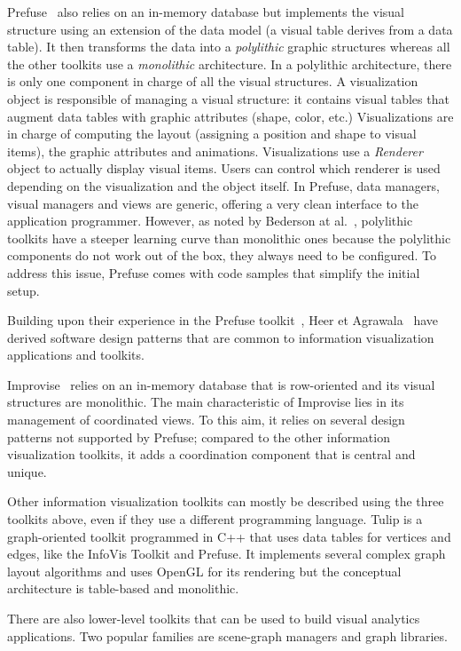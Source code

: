 Prefuse~\cite{Prefuse} also relies on an in-memory database but
implements the visual structure using an extension of the data model
(a visual table derives from a data table).  It then transforms the
data into a \emph{polylithic} graphic structures whereas all the other
toolkits use a \emph{monolithic} architecture.  In a polylithic
architecture, there is only one component in charge of all the visual
structures.  A visualization object is responsible of managing a
visual structure: it contains visual tables that augment data tables
with graphic attributes (shape, color, etc.) Visualizations are in
charge of computing the layout (assigning a position and shape to
visual items), the graphic attributes and animations.  Visualizations
use a \emph{Renderer} object to actually display visual items.  Users
can control which renderer is used depending on the visualization and
the object itself.  In Prefuse, data managers, visual managers and
views are generic, offering a very clean interface to the application
programmer.  However, as noted by Bederson at al.~\cite{Polylithic},
polylithic toolkits have a steeper learning curve than monolithic ones
because the polylithic components do not work out of the box, they
always need to be configured.  To address this issue, Prefuse comes
with code samples that simplify the initial setup.

Building upon their experience in the Prefuse toolkit~\cite{Prefuse},
Heer et Agrawala~\cite{DesignPatternsIV} have derived software design
patterns that are common to information visualization applications and
toolkits. 

Improvise~\cite{Improvise} relies on an in-memory database that is
row-oriented and its visual structures are monolithic.  The main
characteristic of Improvise lies in its management of coordinated
views.  To this aim, it relies on several design patterns
not supported by Prefuse; compared to the other information
visualization toolkits, it adds a coordination component that is
central and unique.

Other information visualization toolkits can mostly be described using
the three toolkits above, even if they use a different programming
language.  Tulip is a graph-oriented toolkit programmed in C++ that
uses data tables for vertices and edges, like the InfoVis Toolkit and
Prefuse.  It implements several complex graph layout algorithms and
uses OpenGL for its rendering but the conceptual architecture is
table-based and monolithic.

There are also lower-level toolkits that can be used to build visual
analytics applications.  Two popular families are scene-graph managers
and graph libraries.

